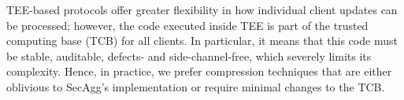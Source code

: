 \documentclass[11pt]{article}
\newcommand{\Z}{\mathbf Z}
\newcommand{\SecAgg}{{\sc SecAgg}\xspace}
\newcommand{\ashkan}[1]{{\color{blue}Ashkan: #1}}
\begin{document}
TEE-based protocols offer greater flexibility in how individual client updates can be processed; however, the code executed inside TEE is part of the trusted computing base (TCB) for all clients. In particular, it means that this code must be stable, auditable, defects- and side-channel-free, which severely limits its complexity. Hence, in practice, we prefer compression techniques that are either oblivious to \SecAgg's implementation or require minimal changes to the TCB.



\end{document}
